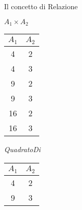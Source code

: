 \begin{frame}{Il concetto di Relazione}
\begin{minipage}[t]{0.4\linewidth}
\begin{center}
\cartesianproductRedQ
\end{center}
\end{minipage}%
\hfill%
\begin{minipage}[t]{0.6\linewidth}
\vspace{-5cm}
\begin{center}
    \begin{minipage}{0.4\textwidth}
        \begin{center}
            $A_1 \times A_2$
            
            \pause
            \begin{tabular}{|c|c|}
                \hline
                \rowcolor{cyan!30}$A_1$ & $A_2$ \\
                \hline
                4 & 2 \\ \hline
                4 & 3 \\ \hline
                9 & 2 \\ \hline
                9 & 3 \\ \hline
                16 & 2 \\ \hline
                16 & 3 \\ \hline
            \end{tabular}
        \end{center}
    \end{minipage}
    \hspace{1cm}
    \begin{minipage}{0.4\textwidth}
        \begin{center}
            \pause
            \textit{QuadratoDi}
            \pause
            \begin{tabular}{|c|c|}
                \hline
                \rowcolor{cyan!30}$A_1$ & $A_2$ \\
                \hline
                4 & 2 \\ \hline
                9 & 3 \\ \hline
            \end{tabular}
        \end{center}
    \end{minipage}
\end{center}
\end{minipage}
\end{frame}
%
